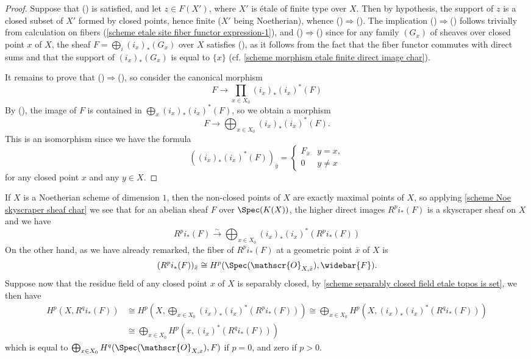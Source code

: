 \begin{proof}
Suppose that () is satisfied, and let $z\in F(X')$, where $X'$ is \'etale of finite type over $X$. Then by hypothesis, the support of $z$ is a closed subset of $X'$ formed by closed points, hence finite ($X'$ being Noetherian), whence ()$\Rightarrow$(). The implication ()$\Rightarrow$() follows trivially from calculation on fibers (\cref{scheme etale site fiber functor expression-1}), and ()$\Rightarrow$() since for any family $(G_x)$ of sheaves over closed point $x$ of $X$, the sheaf $F=\bigoplus_i(i_x)_*(G_x)$ over $X$ satisfies (), as it follows from the fact that the fiber functor commutes with direct sums and that the support of $(i_x)_*(G_x)$ is equal to $\{x\}$ (cf. \cref{scheme morphism etale finite direct image char}).\par
It remains to prove that ()$\Rightarrow$(), so consider the canonical morphism
\[F\to \prod_{x\in X_0}(i_x)_*(i_x)^*(F)\]
By (), the image of $F$ is contained in $\bigoplus_x(i_x)_*(i_x)^*(F)$, so we obtain a morphism
\[F\to\bigoplus_{x\in X_0}(i_x)_*(i_x)^*(F).\]
This is an isomorphism since we have the formula
\[((i_x)_*(i_x)^*(F))_{\bar{y}}=\begin{cases}
F_{\bar{x}}&y=x,\\
0&y\neq x
\end{cases}\]
for any closed point $x$ and any $y\in X$.
\end{proof}

If $X$ is a Noetherian scheme of dimension $1$, then the non-closed points of $X$ are exactly maximal points of $X$, so applying \cref{scheme Noe skyscraper sheaf char} we see that for an abelian sheaf $F$ over $\Spec(K(X))$, the higher direct images $R^pi_*(F)$ is a skyscraper sheaf on $X$ and we have
\[R^pi_*(F) \stackrel{\sim}{\to} \bigoplus_{x\in X_0}(i_x)_*(i_x)^*(R^pi_*(F))\]
On the other hand, as we have already remarked, the fiber of $R^pi_*(F)$ at a geometric point $\bar{x}$ of $X$ is 
\[(R^pi_*(F))_{\bar{x}}\cong H^p(\Spec(\mathscr{O}_{X,\bar{x}}),\widebar{F}).\]
Suppose now that the residue field of any closed point $x$ of $X$ is separably closed, by \cref{scheme separably closed field etale topos is set}, we then have
\begin{align*}
H^p(X,R^qi_*(F))&\cong H^p(X,\bigoplus_{x\in X_0}(i_x)_*(i_x)^*(R^pi_*(F)))\cong \bigoplus_{x\in X_0}H^p(X,(i_x)_*(i_x)^*(R^qi_*(F)))\\
&\cong \bigoplus_{x\in X_0}H^p(x,(i_x)^*(R^qi_*(F)))
\end{align*}
which is equal to $\bigoplus_{x\in X_0}H^q(\Spec(\mathscr{O}_{X,x}),F)$ if $p=0$, and zero if $p>0$.

